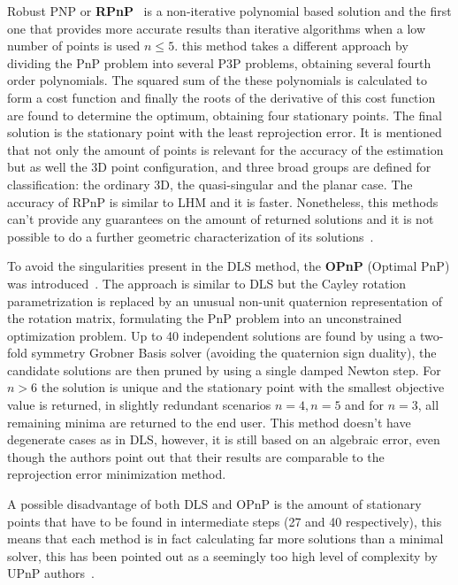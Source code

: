 \documentclass[letterpaper, 10 pt, conference]{ieeeconf}  %
\begin{document}
Robust PNP or \textbf{RPnP}~\cite{Li2012} is a non-iterative polynomial based solution and the first one that provides more accurate results than iterative algorithms when a low number of points is used $n ≤ 5$. this method takes a different approach by dividing the PnP problem into several P3P problems, obtaining several fourth order polynomials. The squared sum of the these polynomials is calculated to form a cost function and finally the roots of the derivative of this cost function are found to determine the optimum, obtaining four stationary points. The final solution is the stationary point with the least reprojection error. It is mentioned that not only the amount of points is relevant for the accuracy of the estimation but as well the 3D point configuration, and three broad groups are defined for classification: the ordinary 3D, the quasi-singular and the planar case. The accuracy of RPnP is similar to LHM and it is faster. Nonetheless, this methods can't provide any guarantees on the amount of returned solutions and it is not possible to do a further geometric characterization of its solutions~\cite{Collins2014}.

To avoid the singularities present in the DLS method, the \textbf{OPnP} (Optimal PnP) was introduced~\cite{Zheng2013}. The approach is similar to DLS but the Cayley rotation parametrization is replaced by an unusual non-unit quaternion representation of the rotation matrix, formulating the PnP problem into an unconstrained optimization problem. Up to 40 independent solutions are found by using a two-fold symmetry Grobner Basis solver (avoiding the quaternion sign duality), the candidate solutions are then pruned by using a single damped Newton step. For $n>6$ the solution is unique and the stationary point with the smallest objective value is returned, in slightly redundant scenarios $n = 4, n = 5$ and for $n=3$, all remaining minima are returned to the end user. This method doesn't have degenerate cases as in DLS, however, it is still based on an algebraic error, even though the authors point out that their results are comparable to the reprojection error minimization method. %

A possible disadvantage of both DLS and OPnP is the amount of stationary points that have to be found in intermediate steps (27 and 40 respectively), this means that each method is in fact calculating far more solutions than a minimal solver, this has been pointed out as a seemingly too high level of complexity by UPnP authors~\cite{Kneip2014}.
\end{document}
